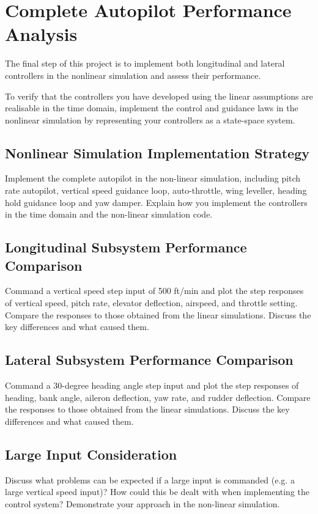 \section{Complete Autopilot Performance Analysis}

The final step of this project is to implement both longitudinal and lateral controllers in the
nonlinear simulation and assess their performance.

To verify that the controllers you have developed using the linear assumptions are realisable in the time domain, implement the control and guidance laws in the nonlinear simulation by representing your controllers as a state-space system.

\subsection{Nonlinear Simulation Implementation Strategy}

Implement the complete autopilot in the non-linear simulation, including pitch rate autopilot, vertical speed guidance loop, auto-throttle, wing leveller, heading hold guidance loop and yaw damper. Explain how you implement the controllers in the time domain and the non-linear simulation code.

\subsection{Longitudinal Subsystem Performance Comparison}

Command a vertical speed step input of 500 ft/min and plot the step responses of vertical speed, pitch rate, elevator deflection, airspeed, and throttle setting. Compare the responses to those obtained from the linear simulations. Discuss the key differences and what caused them.

\subsection{Lateral Subsystem Performance Comparison}

Command a 30-degree heading angle step input and plot the step responses of heading, bank angle, aileron deflection, yaw rate, and rudder deflection. Compare the responses to those obtained from the linear simulations. Discuss the key differences and what caused them.

\subsection{Large Input Consideration}

Discuss what problems can be expected if a large input is commanded (e.g. a large vertical speed input)? How could this be dealt with when implementing the control system? Demonstrate your approach in the non-linear simulation.